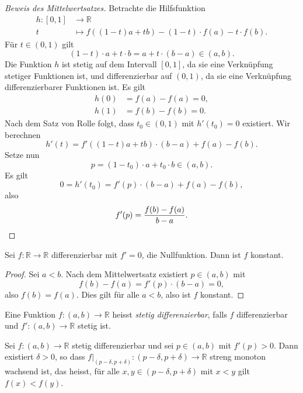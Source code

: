 \documentclass[../main.tex]{subfiles}
\begin{document}
\begin{proof}[Beweis des Mittelwertsatzes]
  Betrachte die Hilfsfunktion
  \begin{align*}
    h \colon [0, 1] & \to \mathbb{R} \\
    t & \mapsto f((1- t)a + tb) - (1-t) \cdot f(a) - t\cdot f(b).
  \end{align*}
  Für $t \in (0, 1)$ gilt
  \[
    (1- t) \cdot a + t \cdot b = a + t \cdot (b-a) \in (a, b).
  \]
  Die Funktion $h$ ist stetig auf dem Intervall $[0, 1]$,
  da sie eine Verknüpfung stetiger Funktionen ist,
  und differenzierbar auf $(0, 1)$, da sie eine Verknüpfung
  differenzierbarer Funktionen ist.
  Es gilt
  \begin{align*}
    h(0) &= f(a) - f(a) = 0,\\
    h(1) & = f(b) - f(b) = 0.
  \end{align*}
  Nach dem Satz von Rolle folgt, dass
  $t_0 \in (0, 1)$ mit $h'(t_0) = 0$
  existiert.
  Wir berechnen \[
    h'(t)  = f'((1-t)a + tb) \cdot (b-a)
  + f(a) - f(b). \]
  Setze nun
  \[
    p = (1- t_0) \cdot a + t_0 \cdot b \in (a, b).
  \]
  Es gilt
  \[
    0 = h'(t_0) = f'(p) \cdot (b-a) + f(a) - f(b),
  \]
  also
  \[
    f'(p) = \frac{f(b) - f(a)}{b-a}. \qedhere
  \]
\end{proof}

\begin{corollary}
  Sei $f \colon \mathbb{R} \to \mathbb{R}$ differenzierbar
  mit $f' = 0$, die Nullfunktion.
  Dann ist $f$ konstant.
\end{corollary}

\begin{proof}
  Sei $a < b$. Nach dem Mittelwertsatz
  existiert $p \in (a, b)$ mit
  \[
    f(b) - f(a) = f'(p) \cdot (b-a) = 0,
  \]
  also $f(b) = f(a)$.
  Dies gilt für alle $a < b$, also
  ist $f$ konstant.
\end{proof}

\begin{definition}
  Eine Funktion $f \colon (a, b) \to \mathbb{R}$
  heisst \emph{stetig differenzierbar}, falls
  $f$ differenzierbar und $f' \colon (a, b) \to \mathbb{R}$
  stetig ist.
\end{definition}


\begin{corollary}\label{cor:strictly-monotone}
  Sei $f \colon (a, b) \to \mathbb{R}$
  stetig differenzierbar und sei
  $p \in (a, b)$ mit $f'(p) > 0$.
  Dann existiert $\delta > 0$,
  so dass $f|_{(p- \delta, p + \delta)}
  \colon (p - \delta, p + \delta) \to \mathbb{R}$
  streng monoton wachsend ist,
  das heisst, für alle $x, y \in (p - \delta, p + \delta)$
  mit $x < y$ gilt
  $f(x) < f(y)$.
\end{corollary}
\end{document}
